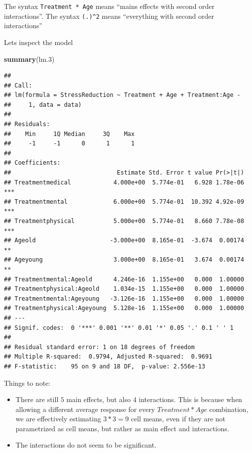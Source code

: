 \documentclass[]{book}
\newenvironment{Shaded}{\begin{snugshade}}{\end{snugshade}}
\newcommand{\KeywordTok}[1]{\textcolor[rgb]{0.13,0.29,0.53}{\textbf{{#1}}}}
\newcommand{\FloatTok}[1]{\textcolor[rgb]{0.00,0.00,0.81}{{#1}}}
\newcommand{\NormalTok}[1]{{#1}}
\providecommand{\tightlist}{%
  \setlength{\itemsep}{0pt}\setlength{\parskip}{0pt}}
\theoremstyle{definition}
\theoremstyle{definition}
\theoremstyle{remark}
\begin{document}
The syntax \texttt{Treatment\ *\ Age} means ``mains effects with second
order interactions''. The syntax \texttt{(.)\^{}2} means ``everything
with second order interactions''

Lets inspect the model

\begin{Shaded}
\begin{Highlighting}[]
\KeywordTok{summary}\NormalTok{(lm}\FloatTok{.3}\NormalTok{)}
\end{Highlighting}
\end{Shaded}

\begin{verbatim}
## 
## Call:
## lm(formula = StressReduction ~ Treatment + Age + Treatment:Age - 
##     1, data = data)
## 
## Residuals:
##    Min     1Q Median     3Q    Max 
##     -1     -1      0      1      1 
## 
## Coefficients:
##                              Estimate Std. Error t value Pr(>|t|)    
## Treatmentmedical            4.000e+00  5.774e-01   6.928 1.78e-06 ***
## Treatmentmental             6.000e+00  5.774e-01  10.392 4.92e-09 ***
## Treatmentphysical           5.000e+00  5.774e-01   8.660 7.78e-08 ***
## Ageold                     -3.000e+00  8.165e-01  -3.674  0.00174 ** 
## Ageyoung                    3.000e+00  8.165e-01   3.674  0.00174 ** 
## Treatmentmental:Ageold      4.246e-16  1.155e+00   0.000  1.00000    
## Treatmentphysical:Ageold    1.034e-15  1.155e+00   0.000  1.00000    
## Treatmentmental:Ageyoung   -3.126e-16  1.155e+00   0.000  1.00000    
## Treatmentphysical:Ageyoung  5.128e-16  1.155e+00   0.000  1.00000    
## ---
## Signif. codes:  0 '***' 0.001 '**' 0.01 '*' 0.05 '.' 0.1 ' ' 1
## 
## Residual standard error: 1 on 18 degrees of freedom
## Multiple R-squared:  0.9794, Adjusted R-squared:  0.9691 
## F-statistic:    95 on 9 and 18 DF,  p-value: 2.556e-13
\end{verbatim}

Things to note:

\begin{itemize}
\tightlist
\item
  There are still \(5\) main effects, but also \(4\) interactions. This
  is because when allowing a different average response for every
  \(Treatment*Age\) combination, we are effectively estimating \(3*3=9\)
  cell means, even if they are not parametrized as cell means, but
  rather as main effect and interactions.
\item
  The interactions do not seem to be significant.
\end{itemize}
\end{document}
